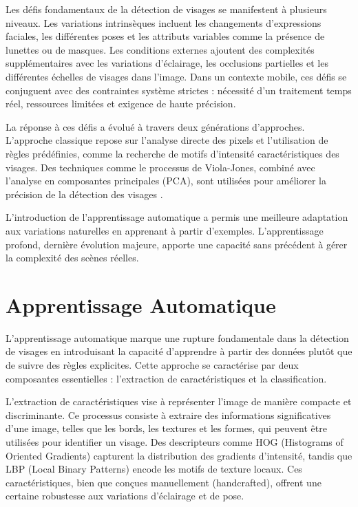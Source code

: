 \begin{onehalfspace}
\hspace{ 0.65cm} Les défis fondamentaux de la détection de visages se manifestent à plusieurs niveaux. Les variations intrinsèques incluent les changements d'expressions faciales, les différentes poses et les attributs variables comme la présence de lunettes ou de masques. Les conditions externes ajoutent des complexités supplémentaires avec les variations d'éclairage, les occlusions partielles et les différentes échelles de visages dans l'image. Dans un contexte mobile, ces défis se conjuguent avec des contraintes système strictes : nécessité d'un traitement temps réel, ressources limitées et exigence de haute précision.

\hspace{0.65cm} La réponse à ces défis a évolué à travers deux générations d'approches. L'approche classique repose sur l'analyse directe des pixels et l'utilisation de règles prédéfinies, comme la recherche de motifs d'intensité caractéristiques des visages. Des techniques comme le processus de Viola-Jones, combiné avec l'analyse en composantes principales (PCA), sont utilisées pour améliorer la précision de la détection des visages \cite{Mamieva2023Improved}.

\hspace{0.65cm} L'introduction de l'apprentissage automatique a permis une meilleure adaptation aux variations naturelles en apprenant à partir d'exemples. L'apprentissage profond, dernière évolution majeure, apporte une capacité sans précédent à gérer la complexité des scènes réelles.

\section{Apprentissage Automatique}
\hspace{0.65cm} L'apprentissage automatique marque une rupture fondamentale dans la détection de visages en introduisant la capacité d'apprendre à partir des données plutôt que de suivre des règles explicites. Cette approche se caractérise par deux composantes essentielles : l'extraction de caractéristiques et la classification.

\hspace{0.65cm} L'extraction de caractéristiques vise à représenter l'image de manière compacte et discriminante. Ce processus consiste à extraire des informations significatives d'une image, telles que les bords, les textures et les formes, qui peuvent être utilisées pour identifier un visage. Des descripteurs comme HOG (Histograms of Oriented Gradients) capturent la distribution des gradients d'intensité, tandis que LBP (Local Binary Patterns) encode les motifs de texture locaux. Ces caractéristiques, bien que conçues manuellement (handcrafted), offrent une certaine robustesse aux variations d'éclairage et de pose.


\end{onehalfspace}
